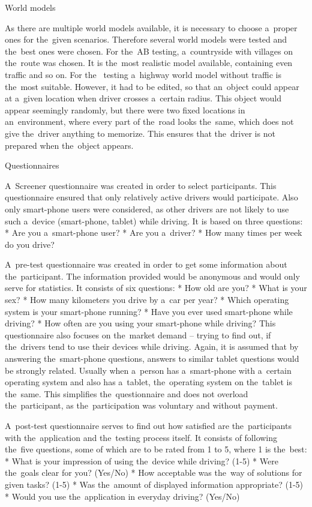 \seccc World models

As there are multiple world models available, it is necessary to choose a~proper ones for the~given scenarios. Therefore several world models were tested and the~best ones were chosen. For the~AB testing, a~countryside with villages on the~route was chosen. It is the~most realistic model available, containing even traffic and so on. For the~ testing a~highway world model without traffic is the~most suitable. However, it had to be edited, so that an~object could appear at a~given location when driver crosses a~certain radius. This object would appear seemingly randomly, but there were two fixed locations in an~environment, where every part of the~road looks the~same, which does not give the~driver anything to memorize. This ensures that the~driver is not prepared when the~object appears.

\seccc Questionnaires

A~Screener questionnaire was created in order to select participants. This questionnaire ensured that only relatively active drivers would participate. Also only smart-phone users were considered, as other drivers are not likely to use such a~device (smart-phone, tablet) while driving. It is based on three questions:
\begitems
* Are you a~smart-phone user?
* Are you a~driver?
* How many times per week do you drive?
\enditems

A~pre-test questionnaire was created in order to get some information about the~participant. The information provided would be anonymous and would only serve for statistics. It consists of six questions:
\begitems
* How old are you?
* What is your sex?
* How many kilometers you drive by a~car per year?
* Which operating system is your smart-phone running?
* Have you ever used smart-phone while driving?
* How often are you using your smart-phone while driving?
\enditems
This questionnaire also focuses on the~market demand -- trying to find out, if the~drivers tend to use their devices while driving. Again, it is assumed that by answering the~smart-phone questions, answers to similar tablet questions would be strongly related. Usually when a~person has a~smart-phone with a~certain operating system and also has a~tablet, the~operating system on the~tablet is the~same. This simplifies the~questionnaire and does not overload the~participant, as the~participation was voluntary and without payment.

A~post-test questionnaire serves to find out how satisfied are the~participants with the~application and the~testing process itself. It consists of following the~five questions, some of which are to be rated from 1 to 5, where 1 is the~best:
\begitems
* What is your impression of using the~device while driving? (1-5)
* Were the~goals clear for you? (Yes/No)
* How acceptable was the~way of solutions for given tasks? (1-5)
* Was the~amount of displayed information appropriate? (1-5)
* Would you use the~application in everyday driving? (Yes/No)
\enditems

